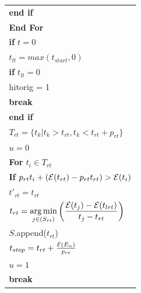 \begin{table}
\begin{minipage}[b]{8cm}
\begin{tabular}{p{7cm}}
\hspace{7mm}\textbf{end if}
\\
\hspace{4mm}\textbf{End For}
\\
\hspace{4mm}\textbf{if} $t=0$
\\
\hspace{7mm}$t_{lt} = max\left(t_{start} , 0\right)$
\\
\hspace{7mm}\textbf{if} $t_{lt} = 0$ 
\\
\hspace{10mm}hitorig = 1
\\
\hspace{10mm}\textbf{break}
\\
\hspace{4mm}\textbf{end if}
\\
\hspace{4mm}$T_{rt} = \{t_k|t_k>t_{rt}, t_k<t_{rt}+p_{rt}\}$
\\
\hspace{4mm}$u=0$
\\
\hspace{4mm}\textbf{For} $t_i \in T_{rt}$
\\
\hspace{7mm}\textbf{If} $p_{rt}t_i + (\mathcal{E}(t_{rt}) - p_{rt}t_{rt}) > \mathcal{E}(t_i)$
\\
\hspace{10mm}$t'_{rt} = t_{rt}$
\\
\hspace{10mm}$t_{rt} = \displaystyle \operatorname*{arg\,min}_{j\in(S_{rt})}\left(\dfrac{\mathcal{E}(t_j)-\mathcal{E}(t_{lrt})}{t_j-t_{rt}}\right)$
\\
\hspace{10mm}$S$.append($t_{rt}$)
\\
\hspace{10mm}$t_{stop} = t_{rt} + \frac{\mathcal{E}(E_n)}{p_{rt}}$
\\
\hspace{10mm}$u=1$
\\
\hspace{10mm}\textbf{break}
\\

\end{tabular}
\end{minipage}
\end{table}

